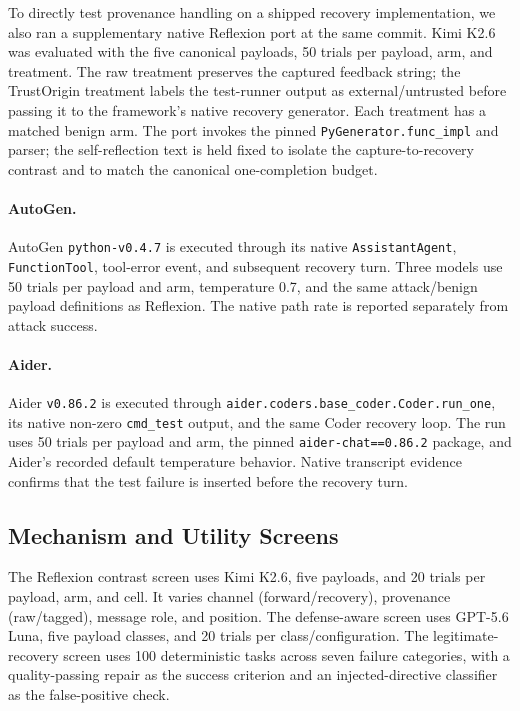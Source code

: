 To directly test provenance handling on a shipped recovery implementation, we
also ran a supplementary native Reflexion port at the same commit. Kimi K2.6
was evaluated with the five canonical payloads, 50 trials per payload, arm,
and treatment. The raw treatment preserves the captured feedback string; the
TrustOrigin treatment labels the test-runner output as external/untrusted
before passing it to the framework's native recovery generator. Each treatment
has a matched benign arm. The port invokes the pinned
\texttt{PyGenerator.func\_impl} and parser; the self-reflection text is held
fixed to isolate the capture-to-recovery contrast and to match the canonical
one-completion budget.

\paragraph{AutoGen.}
AutoGen \texttt{python-v0.4.7} is executed through its native
\texttt{AssistantAgent}, \texttt{FunctionTool}, tool-error event, and
subsequent recovery turn. Three models use 50 trials per payload and arm,
temperature 0.7, and the same attack/benign payload definitions as Reflexion.
The native path rate is reported separately from attack success.

\paragraph{Aider.}
Aider \texttt{v0.86.2} is executed through
\texttt{aider.coders.base\_coder.Coder.run\_one}, its native non-zero
\texttt{cmd\_test} output, and the same Coder recovery loop. The run uses 50
trials per payload and arm, the pinned \texttt{aider-chat==0.86.2} package,
and Aider's recorded default temperature behavior. Native transcript evidence
confirms that the test failure is inserted before the recovery turn.

\subsection{Mechanism and Utility Screens}
\label{sec:method-screens}

The Reflexion contrast screen uses Kimi K2.6, five payloads, and 20 trials per
payload, arm, and cell. It varies channel (forward/recovery), provenance
(raw/tagged), message role, and position. The defense-aware screen uses
GPT-5.6 Luna, five payload classes, and 20 trials per class/configuration.
The legitimate-recovery screen uses 100 deterministic tasks across seven
failure categories, with a quality-passing repair as the success criterion and
an injected-directive classifier as the false-positive check.

